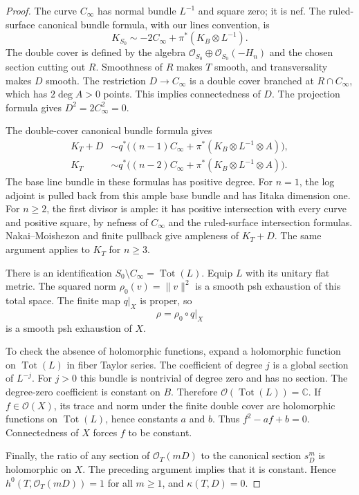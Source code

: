\documentclass[11pt]{amsart}
\theoremstyle{definition}
\theoremstyle{remark}
\numberwithin{equation}{section}
\newcommand{\C}{\mathbb C}
\newcommand{\OO}{\mathcal O}
\newcommand{\Tot}{\operatorname{Tot}}
\begin{document}
\begin{proof}
The curve $C_\infty$ has normal bundle $L^{-1}$ and square zero; it is
nef.  The ruled-surface canonical bundle formula, with our lines
convention, is
\[
 K_{S_0}\sim-2C_\infty+\pi^*(K_B\otimes L^{-1}).
\]
The double cover is defined by the algebra
$\OO_{S_0}\oplus\OO_{S_0}(-H_n)$ and the chosen section cutting out
$R$.  Smoothness of $R$ makes $T$ smooth, and transversality makes
$D$ smooth.  The restriction $D\to C_\infty$ is a double cover
branched at $R\cap C_\infty$, which has
$2\deg A>0$ points.  This implies connectedness of $D$.
The projection formula gives $D^2=2C_\infty^2=0$.

The double-cover canonical bundle formula gives
\begin{align*}
 K_T+D&\sim q^*\bigl((n-1)C_\infty+
       \pi^*(K_B\otimes L^{-1}\otimes A)\bigr),\\
 K_T&\sim q^*\bigl((n-2)C_\infty+
       \pi^*(K_B\otimes L^{-1}\otimes A)\bigr).
\end{align*}
The base line bundle in these formulas has positive degree.  For
$n=1$, the log adjoint is pulled back from this ample base bundle and
has Iitaka dimension one.  For $n\ge2$, the first divisor is ample:
it has positive intersection with every curve and positive square,
by nefness of $C_\infty$ and the ruled-surface intersection formulas.
Nakai--Moishezon and finite pullback give ampleness of $K_T+D$.
The same argument applies to $K_T$ for $n\ge3$.

There is an identification $S_0\setminus C_\infty=\Tot(L)$.
Equip $L$ with its unitary flat metric.  The squared norm
$\rho_0(v)=\|v\|^2$ is a smooth psh exhaustion of this total space.
The finite map $q|_X$ is proper, so
\[
 \rho=\rho_0\circ q|_X
\]
is a smooth psh exhaustion of $X$.

To check the absence of holomorphic functions, expand a holomorphic
function on $\Tot(L)$ in fiber Taylor series.  The coefficient of
degree $j$ is a global section of $L^{-j}$.  For $j>0$ this bundle is
nontrivial of degree zero and has no section.  The degree-zero
coefficient is constant on $B$.  Therefore
$\OO(\Tot(L))=\C$.  If $f\in\OO(X)$, its trace and norm under the
finite double cover are holomorphic functions on $\Tot(L)$, hence
constants $a$ and $b$.  Thus $f^2-af+b=0$.  Connectedness of $X$
forces $f$ to be constant.

Finally, the ratio of any section of $\OO_T(mD)$ to the canonical
section $s_D^m$ is holomorphic on $X$.  The preceding argument implies
that it is constant.  Hence $h^0(T,\OO_T(mD))=1$ for all $m\ge1$,
and $\kappa(T,D)=0$.
\end{proof}
\end{document}
